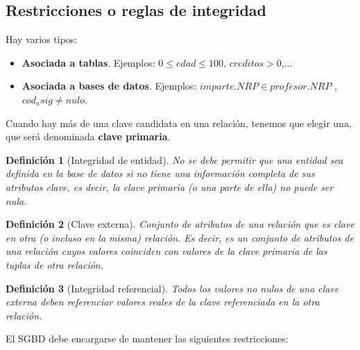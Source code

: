 \documentclass[12pt,spanish]{article}
\newtheorem{definition}{Definición}
\numberwithin{definition}{subsection}
\begin{document}
\subsection{Restricciones o reglas de integridad}

Hay varios tipos:

\begin{itemize}
	\item \textbf{Asociada a tablas}. Ejemplos: $0 \leq edad \leq 100$, $creditos > 0$,...
	\item \textbf{Asociada a bases de datos}. Ejemplos: $imparte.NRP \in profesor.NRP$ , $cod_asig \neq nulo$.
\end{itemize}


Cuando hay más de una clave candidata en una relación, tenemos que elegir una, que será denominada \textbf{clave primaria}.

\begin{definition}[Integridad de entidad]
	No se debe permitir que una entidad sea definida en la base de datos si no tiene una información completa de sus atributos clave, es decir, la clave primaria (o una parte de ella) no puede ser nula.
\end{definition}


\begin{definition}[Clave externa]
	Conjunto de atributos de una relación que es clave en otra (o incluso en la misma) relación. Es decir, es un conjunto de atributos de una relación cuyos valores coinciden con valores de la clave primaria de las tuplas de otra relación.
\end{definition}


\begin{definition}[Integridad referencial]
	Todos los valores no nulos de una clave externa deben referenciar valores reales de la clave referenciada en la otra relación.
\end{definition}


El SGBD debe encargarse de mantener las siguientes restricciones:
\end{document}

